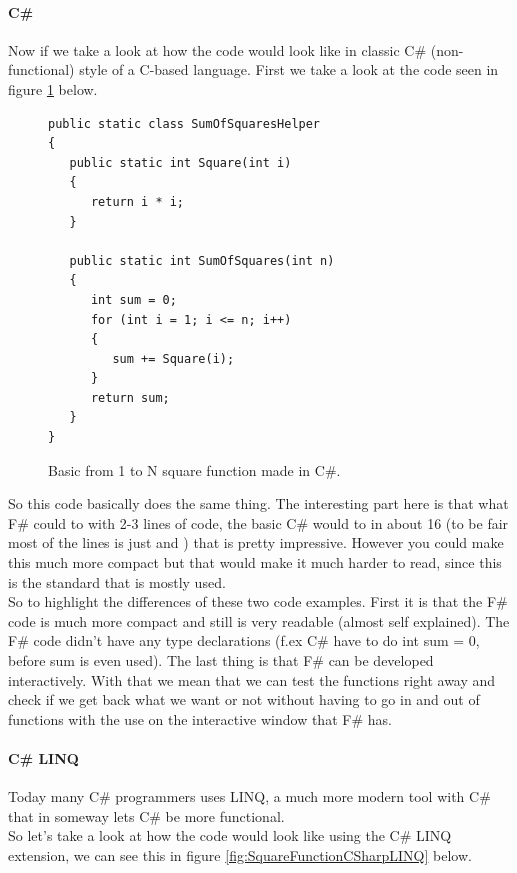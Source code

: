 \documentclass[12pt, a4paper]{article}
\begin{document}
\newpage

\paragraph{C\#}
Now if we take a look at how the code would look like in classic C\# (non-functional) style of a C-based language. First we take a look at the code seen in figure \ref{fig:SquareFunctionCSharp} below.

\begin{figure}[!h]
\begin{lstlisting}
public static class SumOfSquaresHelper
{
   public static int Square(int i)
   {
      return i * i;
   }

   public static int SumOfSquares(int n)
   {
      int sum = 0;
      for (int i = 1; i <= n; i++)
      {
         sum += Square(i);
      }
      return sum;
   }
}
\end{lstlisting}
\caption{Basic from 1 to N square function made in C\#.}
\label{fig:SquareFunctionCSharp}
\end{figure}

So this code basically does the same thing. The interesting part here is that what F\# could to with 2-3 lines of code, the basic C\# would to in about 16 (to be fair most of the lines is just { and }) that is pretty impressive. However you could make this much more compact but that would make it much harder to read, since this is the standard that is mostly used.\\

So to highlight the differences of these two code examples. First it is that the F\# code is much more compact and still is very readable (almost self explained). The F\# code didn't have any type declarations (f.ex C\# have to do int sum = 0, before sum is even used). The last thing is that F\# can be developed interactively. With that we mean that we can test the functions right away and check if we get back what we want or not without having to go in and out of functions with the use on the interactive window that F\# has.

\newpage

\paragraph{C\# LINQ}
Today many C\# programmers uses LINQ, a much more modern tool with C\# that in someway lets C\# be more functional.\\

So let’s take a look at how the code would look like using the C\# LINQ extension, we can see this in figure \ref{fig:SquareFunctionCSharpLINQ} below.
\end{document}
